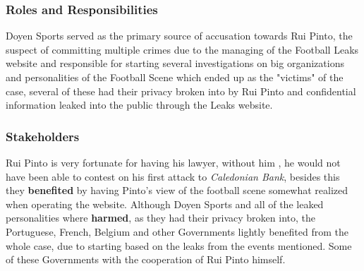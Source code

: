 \subsubsection{Roles and Responsibilities}
    Doyen Sports served as the primary source of accusation towards Rui Pinto, the suspect of committing multiple crimes due to the managing of the Football Leaks website and responsible for starting several investigations on big organizations and personalities of the Football Scene which ended up as the "victims" of the case, several of these had their privacy broken into by Rui Pinto and confidential information leaked into the public through the Leaks website.

\subsubsection{Stakeholders}

Rui Pinto is very fortunate for having his lawyer, without him , he would not have been able to contest on his first attack to \textit{Caledonian Bank}, besides this they \textbf{benefited} by having Pinto's view of the football scene somewhat realized when operating the website.
Although Doyen Sports and all of the leaked personalities where \textbf{harmed}, as they had their privacy broken into, the Portuguese, French, Belgium and other Governments lightly benefited from the whole case, due to starting based on the leaks from the events mentioned. 
Some of these Governments with the cooperation of Rui Pinto himself.


